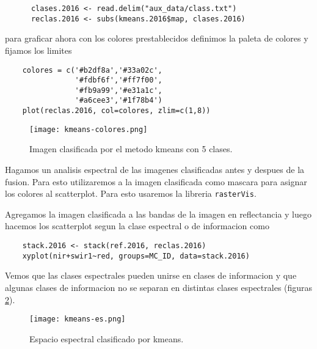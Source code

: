 \begin{exa}
  \begin{lstlisting}
      clases.2016 <- read.delim("aux_data/class.txt")
      reclas.2016 <- subs(kmeans.2016$map, clases.2016)
  \end{lstlisting}

  para graficar ahora con los colores prestablecidos definimos la paleta de colores y fijamos los limites

  \begin{lstlisting}
    colores = c('#b2df8a','#33a02c',
                '#fdbf6f','#ff7f00',
                '#fb9a99','#e31a1c',
                '#a6cee3','#1f78b4')
    plot(reclas.2016, col=colores, zlim=c(1,8))
  \end{lstlisting}
  \begin{figure}
    \texttt{[image: kmeans-colores.png]}
    \caption{Imagen clasificada por el metodo kmeans con 5 clases.}
    \label{fig:kmean5}
  \end{figure}
\end{exa}

\begin{exa}
  Hagamos un analisis espectral de las imagenes clasificadas antes y despues de la fusion.
  Para esto utilizaremos a la imagen clasificada como mascara para asignar los colores
  al scatterplot. Para esto usaremos la libreria \texttt{rasterVis}.

  Agregamos la imagen clasificada a las bandas de la imagen en reflectancia y luego
  hacemos los scatterplot segun la clase espectral o de informacion como

  \begin{lstlisting}
    stack.2016 <- stack(ref.2016, reclas.2016)
    xyplot(nir+swir1~red, groups=MC_ID, data=stack.2016)
  \end{lstlisting}
  Vemos que las clases espectrales pueden unirse en clases de informacion y que algunas clases de informacion no se separan en distintas clases espectrales (figuras \ref{fig:esk}).
  \begin{figure}
    \texttt{[image: kmeans-es.png]}
    \caption{Espacio espectral clasificado por kmeans.}
    \label{fig:esk}
  \end{figure}

\end{exa}

